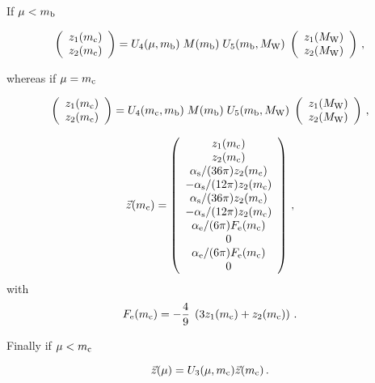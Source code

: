 If $\mu<m_{\mathrm b}$ 

\begin{equation}
\left( \begin{array}{ll} z_1(m_{\mathrm c}) \\ z_2(m_{\mathrm c}) \end{array} \right) =
U_4(\mu,m_{\mathrm b}) \; M(m_{\mathrm b}) \; U_5(m_{\mathrm b},M_{\mathrm W}) \;
\left( \begin{array}{ll} z_1(M_{\mathrm W}) \\ z_2(M_{\mathrm W}) \end{array} \right) \, ,
\label{eq:zmc12}
\end{equation}

whereas if $\mu=m_{\mathrm c}$ 

\begin{equation}
\left( \begin{array}{ll} z_1(m_{\mathrm c}) \\ z_2(m_{\mathrm c}) \end{array} \right) =
U_4(m_{\mathrm c},m_{\mathrm b}) \; M(m_{\mathrm b}) \; U_5(m_{\mathrm b},M_{\mathrm W}) \;
\left( \begin{array}{ll} z_1(M_{\mathrm W}) \\ z_2(M_{\mathrm W}) \end{array} \right) \, ,
\label{eq:zmc12}
\end{equation}

\begin{equation}
\vec{z} (m_{\mathrm c}) =
\left( \begin{array}{c}
z_1 (m_{\mathrm c}) \\ z_2 (m_{\mathrm c}) \\
\alpha_{\mathrm s}/(36\pi) z_2 (m_{\mathrm c}) \\
-\alpha_{\mathrm s}/(12 \pi) z_2 (m_{\mathrm c}) \\
\alpha_{\mathrm s}/(36\pi) z_2 (m_{\mathrm c}) \\
-\alpha_{\mathrm s}/(12 \pi) z_2 (m_{\mathrm c}) \\
\alpha_{\mathrm e}/(6\pi) F_{ \mathrm e} (m_{\mathrm c}) \\  0  \\
\alpha_{\mathrm e}/(6\pi) F_{ \mathrm e} (m_{\mathrm c}) \\  0
\end{array} \right) \, ,
\label{eq:zmc:1010}
\end{equation}
with
\begin{equation}
F_{ \mathrm e} (m_{\mathrm c}) =
-\frac{4}{9} \; \left( 3 z_1(m_{\mathrm c}) + z_2(m_{\mathrm c}) \right) \, .
\label{eq:Femc}
\end{equation}

Finally if $\mu<m_{\mathrm c}$

\begin{equation}
\vec{z}(\mu) = U_3(\mu,m_{\mathrm c}) \vec{z}(m_{\mathrm c}) \, .
\label{eq:WCz}
\end{equation}

